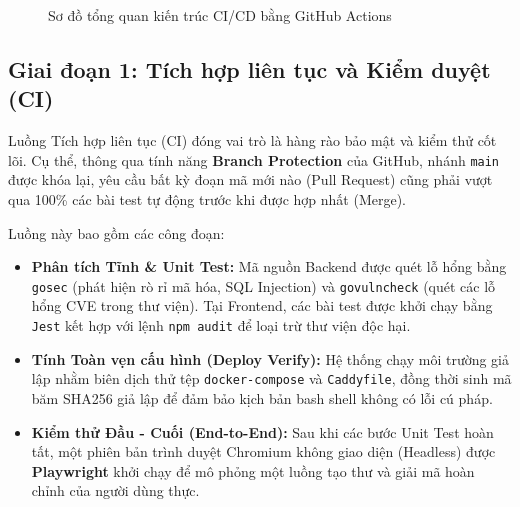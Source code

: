 \begin{figure}[htbp]
    \caption[Sơ đồ kiến trúc CI/CD bằng GitHub Actions]{Sơ đồ tổng quan kiến trúc CI/CD bằng GitHub Actions}
    \label{fig:cicd_pipeline}
\end{figure}

\subsection[Tích hợp liên tục và Kiểm duyệt (CI)]{Giai đoạn 1: Tích hợp liên tục và Kiểm duyệt (CI)}
Luồng Tích hợp liên tục (CI) đóng vai trò là hàng rào bảo mật và kiểm thử cốt lõi. Cụ thể, thông qua tính năng \textbf{Branch Protection} của GitHub, nhánh \texttt{main} được khóa lại, yêu cầu bất kỳ đoạn mã mới nào (Pull Request) cũng phải vượt qua 100\% các bài test tự động trước khi được hợp nhất (Merge).

Luồng này bao gồm các công đoạn:
\begin{itemize}
    \item \textbf{Phân tích Tĩnh \& Unit Test:} Mã nguồn Backend được quét lỗ hổng bằng \texttt{gosec} (phát hiện rò rỉ mã hóa, SQL Injection) và \texttt{govulncheck} (quét các lỗ hổng CVE trong thư viện). Tại Frontend, các bài test được khởi chạy bằng \texttt{Jest} kết hợp với lệnh \texttt{npm audit} để loại trừ thư viện độc hại.
    \item \textbf{Tính Toàn vẹn cấu hình (Deploy Verify):} Hệ thống chạy môi trường giả lập nhằm biên dịch thử tệp \texttt{docker-compose} và \texttt{Caddyfile}, đồng thời sinh mã băm SHA256 giả lập để đảm bảo kịch bản bash shell không có lỗi cú pháp.
    \item \textbf{Kiểm thử Đầu - Cuối (End-to-End):} Sau khi các bước Unit Test hoàn tất, một phiên bản trình duyệt Chromium không giao diện (Headless) được \textbf{Playwright} khởi chạy để mô phỏng một luồng tạo thư và giải mã hoàn chỉnh của người dùng thực.
\end{itemize}

